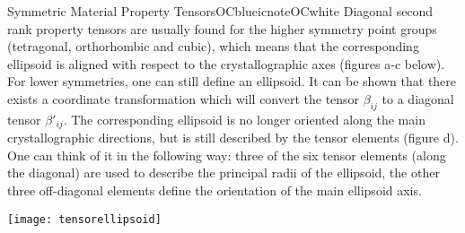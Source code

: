 \begin{messagebox}{Symmetric Material Property Tensors}{OCblue}{icnote}{OCwhite}
Diagonal second rank property tensors are usually found for the higher symmetry point groups (tetragonal, orthorhombic and cubic), which means that the corresponding ellipsoid is aligned with respect to the crystallographic axes (figures a-c below).  For lower symmetries, one can still define an ellipsoid.  It can be shown that there exists a coordinate transformation which will convert the tensor $\beta_{ij}$ to a diagonal tensor $\beta'_{ij}$.  The corresponding ellipsoid is no longer oriented along the main crystallographic directions, but is still described by the tensor elements (figure d).  One can think of it in the following way: three of the six tensor elements (along the diagonal) are used to describe the principal radii of the ellipsoid, the other three off-diagonal elements define the orientation of the main ellipsoid axis.  

\texttt{[image: tensorellipsoid]}
\end{messagebox}








